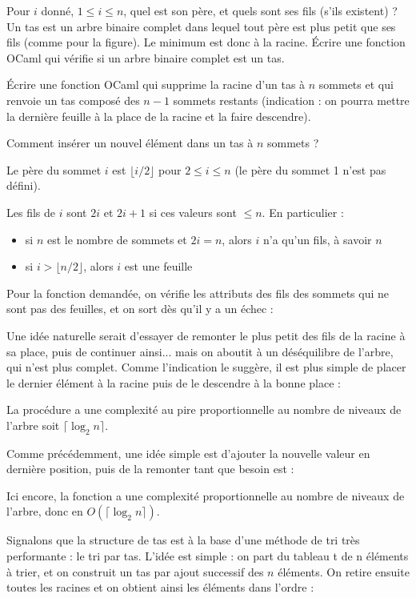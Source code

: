 \Q
Pour $i$ donné, $1 \leq i \leq n$, quel est son père, et quels sont ses fils (s'ils existent) ? Un tas est un arbre binaire complet dans lequel tout père est plus petit que ses fils (comme pour la figure). Le minimum est donc à la racine. Écrire une fonction OCaml qui vérifie si un arbre binaire complet est un tas.

\Q
Écrire une fonction OCaml qui supprime la racine d'un tas à $n$ sommets et qui renvoie un tas composé des $n-1$ sommets restants (indication : on pourra mettre la dernière feuille à la place de la racine et la faire descendre).

\Q
Comment insérer un nouvel élément dans un tas à $n$ sommets ?

\Corrige

\Q
Le père du sommet $i$ est $\lfloor i/2 \rfloor$ pour $2 \leq i \leq n$ (le père du sommet 1 n'est pas défini).
\smallskip

Les fils de $i$ sont $2i$ et $2i+1$ si ces valeurs sont $\leq n$. En particulier :
\begin{itemize}
    \item si $n$ est le nombre de sommets et $2i=n$, alors $i$ n'a qu'un fils, à savoir $n$
    \item si $i>\lfloor n/2 \rfloor$, alors $i$ est une feuille
\end{itemize}
Pour la fonction demandée, on vérifie les attributs des fils des sommets qui ne sont pas des feuilles, et on sort dès qu'il y a un échec :



\Q
Une idée naturelle serait d'essayer de remonter le plus petit des fils de la racine à sa place, puis de continuer ainsi... mais on aboutit à un déséquilibre de l'arbre, qui n'est plus complet. Comme l'indication le suggère, il est plus simple de placer le dernier élément à la racine puis de le descendre à la bonne place :



La procédure a une complexité au pire proportionnelle au nombre de niveaux de l'arbre soit $\lceil \log_2n\rceil$.

\Q
Comme précédemment, une idée simple est d'ajouter la nouvelle valeur en dernière position, puis de la remonter tant que besoin est :



Ici encore, la fonction a une complexité proportionnelle au nombre de niveaux de l'arbre, donc en $O(\lceil \log_2n \rceil)$.
\medskip

Signalons que la structure de tas est à la base d'une méthode de tri très performante : le tri par tas. L'idée est simple : on part du tableau t de n éléments à trier, et on construit un tas par ajout successif des $n$ éléments. On retire ensuite toutes les racines et on obtient ainsi les éléments dans l'ordre :



